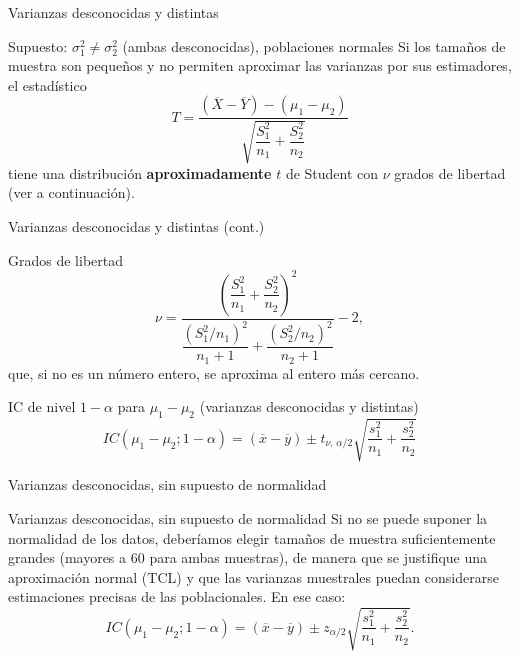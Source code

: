 \documentclass[aspectratio=169,11pt]{beamer}
\begin{document}
\begin{frame}{Varianzas desconocidas y distintas}
\begin{block}{Supuesto: $\sigma_1^2\neq\sigma_2^2$ (ambas desconocidas), poblaciones normales}
Si los tamaños de muestra son pequeños y no permiten aproximar las varianzas por sus estimadores, el estadístico
\[
T = \frac{(\overline X-\overline Y)-(\mu_1-\mu_2)}{\sqrt{\dfrac{S_1^2}{n_1}+\dfrac{S_2^2}{n_2}}}
\]
tiene una distribución \textbf{aproximadamente} $t$ de Student con $\nu$ grados de libertad (ver a continuación).
\end{block}
\end{frame}

\begin{frame}{Varianzas desconocidas y distintas (cont.)}
\begin{block}{Grados de libertad}
\[
\nu = \frac{\left(\dfrac{S_1^2}{n_1}+\dfrac{S_2^2}{n_2}\right)^2}{\dfrac{\left(S_1^2/n_1\right)^2}{n_1+1}+\dfrac{\left(S_2^2/n_2\right)^2}{n_2+1}} - 2,
\]
que, si no es un número entero, se aproxima al entero más cercano.
\end{block}

\begin{alertblock}{IC de nivel $1-\alpha$ para $\mu_1-\mu_2$ (varianzas desconocidas y distintas)}
\[
IC(\mu_1-\mu_2;1-\alpha) = (\overline x-\overline y) \pm t_{\nu,\,\alpha/2}\sqrt{\frac{s_1^2}{n_1}+\frac{s_2^2}{n_2}}
\]
\end{alertblock}
\end{frame}

\begin{frame}{Varianzas desconocidas, sin supuesto de normalidad}
\begin{block}{Varianzas desconocidas, sin supuesto de normalidad}
Si no se puede suponer la normalidad de los datos, deberíamos elegir tamaños de muestra suficientemente grandes (mayores a $60$ para ambas muestras), de manera que se justifique una aproximación normal (TCL) y que las varianzas muestrales puedan considerarse estimaciones precisas de las poblacionales. En ese caso:
\[
IC(\mu_1-\mu_2;1-\alpha) = (\overline x-\overline y) \pm z_{\alpha/2}\sqrt{\frac{s_1^2}{n_1}+\frac{s_2^2}{n_2}}.
\]
\end{block}
\end{frame}
\end{document}
